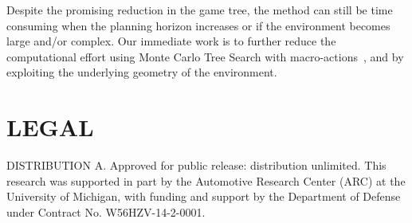 \documentclass[10 pt, conference]{ieeeconf}
\begin{document}
Despite the promising reduction in the game tree, the method can still be time consuming when the planning horizon increases or if the environment becomes large and/or complex. Our immediate work is to further reduce the computational effort using Monte Carlo Tree Search with macro-actions~\cite{lim2011monte}, and by exploiting the underlying geometry of the environment.

\section*{LEGAL}%
DISTRIBUTION A. Approved for public release: distribution unlimited. This research was supported in part by the Automotive Research Center (ARC) at the University of Michigan, with funding and support by the Department of Defense under Contract No. W56HZV-14-2-0001.



\end{document}
